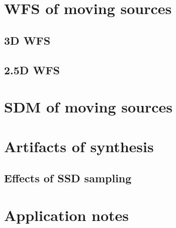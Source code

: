 \section{WFS of moving sources}
	\subsection{3D WFS}
	\subsection{2.5D WFS}
	
\section{SDM of moving sources}

\section{Artifacts of synthesis}
	\subsection{Effects of SSD sampling}
	
\section{Application notes}